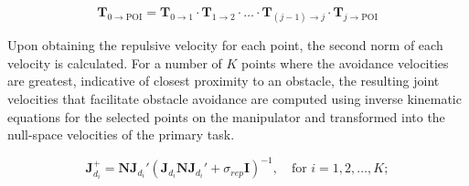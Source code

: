 \documentclass[letterpaper, 10 pt, conference]{ieeeconf}  %
\begin{document}

\begin{equation}
	\mathbf{T}_{0 \rightarrow \text{POI}} = \mathbf{T}_{0 \rightarrow 1} \cdot \mathbf{T}_{1 \rightarrow 2} \cdot \ldots \cdot \mathbf{T}_{(j-1) \rightarrow j} \cdot \mathbf{T}_{j \rightarrow \text{POI}}	
	\label{eq:transformations}
\end{equation}



Upon obtaining the repulsive velocity for each point, the second norm of each velocity is calculated. For a number of $K$ points where the avoidance velocities are greatest, indicative of closest proximity to an obstacle, the resulting joint velocities that facilitate obstacle avoidance are computed using inverse kinematic equations for the selected points on the manipulator and transformed into the null-space velocities of the primary task.



\begin{equation}
	\mathbf{J}_{d_i}^{+} = \mathbf{N} \mathbf{J}_{d_i}' (\mathbf{J}_{d_i} \mathbf{N} \mathbf{J}_{d_i}' + \sigma_{rep} \mathbf{I})^{-1}, \quad \text{for } i = 1, 2, \ldots, K;
\end{equation}


\end{document}
